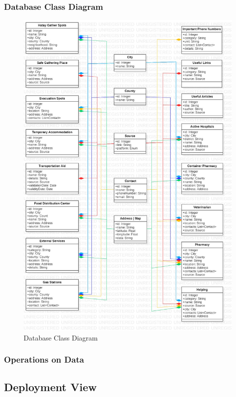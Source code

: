 \subsubsection{Database Class Diagram}

\begin{figure}[H]
  \centering
  \includegraphics[width=\linewidth]{img/database-class-diagram.jpg}
  \caption{Database Class Diagram}
\end{figure}

\subsubsection{Operations on Data}

\subsection{Deployment View}

